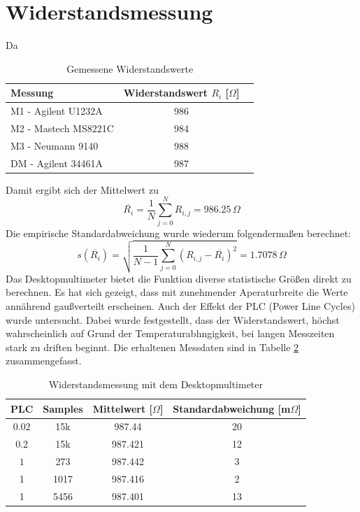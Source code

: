 \section{Widerstandsmessung}
Da 
\begin{table}[h]
	\centering
	\begin{tabular}{|l|c|c|}
	\hline 
	Messung & Widerstandswert $R_i$ [$\Omega$]\\ 
	\hline 
	M1 - Agilent U1232A & 986		\\ 
	\hline 
	M2 - Mastech MS8221C & 984		\\ 
	\hline 
	M3 - Neumann 9140 & 988		\\ 
	\hline 
	DM - Agilent 34461A & 987		\\ 
	\hline 
	\end{tabular}
	\caption{Gemessene Widerstandswerte}
	\label{tb:widerstandswerte}
\end{table} \noindent
Damit ergibt sich der Mittelwert zu
\begin{equation}
	\overline{R_i} = \frac{1}{N} \sum\limits_{j=0}^N R_{i,j} = 986.25\, \Omega
	\label{eq:mittelw}
\end{equation}
Die empirische Standardabweichung wurde wiederum folgendermaßen berechnet:
\begin{equation}
	s(\overline{R_i}) = \sqrt{\frac{1}{N-1} \sum\limits_{j=0}^N (R_{i,j} - \overline{R_i})^2} = 1.7078\, \Omega 
	\label{eq:stdabw}
\end{equation}
Das Desktopmultimeter bietet die Funktion diverse statistische Größen direkt zu berechnen. Es hat sich gezeigt, dass mit zunehmender Aperaturbreite die Werte annährend gaußverteilt erscheinen. Auch der Effekt der PLC (Power Line Cycles) wurde untersucht. Dabei wurde festgestellt, dass der Widerstandswert, höchst wahrscheinlich auf Grund der Temperaturabhngigkeit, bei langen Messzeiten stark zu driften beginnt. Die erhaltenen Messdaten sind in Tabelle \ref{tb:widerstand_dm} zusammengefasst.
\begin{table}[h]
	\centering
	\begin{tabular}{|c|c|c|c|}
	\hline 
	PLC & Samples & Mittelwert [$\Omega$] & Standardabweichung [m$\Omega$] \\ 
	\hline 
	$0.02$ & 15k & 987.44 & 20 \\ 
	\hline 
	$0.2$ & 15k & 987.421 & 12 \\ 
	\hline 
	$1$ & 273 & 987.442 & 3 \\ 
	\hline 
	1 & 1017 & 987.416 & 2 \\ 
	\hline 
	1 & 5456 & 987.401 & 13 \\ 
	\hline 
	\end{tabular}
	\caption{Widerstandsmessung mit dem Desktopmultimeter}
	\label{tb:widerstand_dm}
\end{table}

